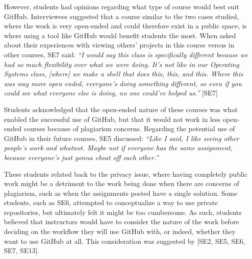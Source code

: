 However, students had opinions regarding what type of course would best suit GitHub. Interviewees suggested that a course similar to the two cases studied, where the work is very open-ended and could therefore exist in a public space, is where using a tool like GitHub would benefit students the most. When asked about their experiences with viewing others' projects in this course versus in other courses, SE7 said: \textit{``I would say this class is specifically different because we had so much flexibility over what we were doing. It's not like in our Operating Systems class, [where] we make a shell that does this, this, and this. Where this was way more open ended, everyone's doing something different, so even if you could see what everyone else is doing, no one could've helped us.''} [SE7]

Students acknowledged that the open-ended nature of these courses was what enabled the successful use of GitHub, but that it would not work in less open-ended courses because of plagiarism concerns. Regarding the potential use of GitHub in their future courses, SE5 discussed: \textit{``Like I said, I like seeing other people's work and whatnot. Maybe not if everyone has the same assignment, because everyone's just gonna cheat off each other.''}



These students related back to the privacy issue, where having completely public work might be a detriment to the work being done when there are concerns of plagiarism, such as when the assignments posted have a single solution. Some students, such as SE6, attempted to conceptualize a way to use private repositories, but ultimately felt it might be too cumbersome. As such, students believed that instructors would have to consider the nature of the work before deciding on the workflow they will use GitHub with, or indeed, whether they want to use GitHub at all. This consideration was suggested by [SE2, SE5, SE6, SE7, SE13].

